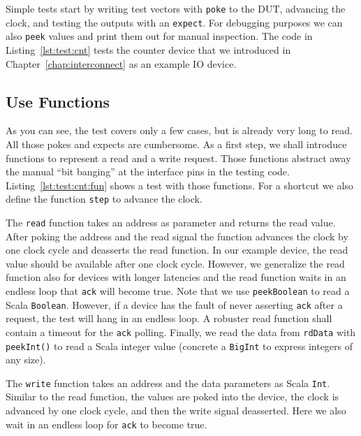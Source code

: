 \documentclass[%
    10pt,
    headinclude, footexclude,
    openright, %
    notitlepage,
    cleardoubleempty,
    headsepline,
    pointlessnumbers,
    bibtotoc, idxtotoc,
    ]{scrbook}
\newcommand{\code}[1]{{\lstinline[basicstyle=\small\ttfamily]{#1}}}
\begin{document}

Simple tests start by writing test vectors with \code{poke} to the DUT, advancing the
clock, and testing the outputs with an \code{expect}. For debugging purposes we can also
\code{peek} values and print them out for manual inspection. The code in Listing~\ref{lst:test:cnt} tests the
counter device that we introduced in Chapter~\ref{chap:interconnect} as an example IO device.


\subsection{Use Functions}

As you can see, the test covers only a few cases, but is already very long to read.
All those pokes and expects are cumbersome. As a first step, we shall introduce
functions to represent a read and a write request. Those functions abstract away the manual
``bit banging'' at the interface pins in the testing code.
Listing~\ref{lst:test:cnt:fun} shows a test with those functions. For a shortcut we also define
the function \code{step} to advance the clock.


The \code{read} function takes an address
as parameter and returns the read value. After poking the address and the read signal the function
advances the clock by one clock cycle and deasserts the read function. In our example device,
the read value should be available after one clock cycle. However, we generalize the read function
also for devices with longer latencies and the read function waits in an endless loop that \code{ack}
will become true. Note that we use \code{peekBoolean} to read a Scala \code{Boolean}.
However, if a device has the fault of never asserting \code{ack} after a request,
the test will hang in an endless loop. A robuster read function shall contain a timeout for the \code{ack}
polling. Finally, we read the data from \code{rdData} with \code{peekInt()} to read a Scala integer
value (concrete a \code{BigInt} to express integers of any size).

The \code{write} function takes an address and the data parameters as Scala \code{Int}.
Similar to the read function, the values are poked into the device, the clock is advanced by one
clock cycle, and then the write signal deasserted. Here we also wait in an endless loop for
\code{ack} to become true.
\end{document}
